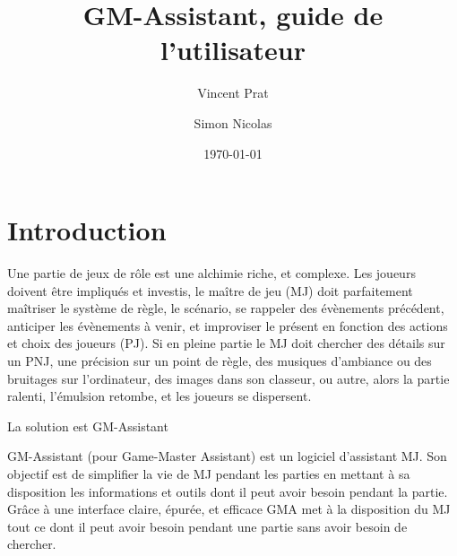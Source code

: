 \documentclass[12pt]{article}
\title{GM-Assistant, guide de l'utilisateur}
\author{
        Vincent Prat
            \and
        Simon Nicolas
}
\date{\today}
\begin{document}
\maketitle


\section{Introduction}
Une partie de jeux de rôle est une alchimie riche, et complexe. Les joueurs doivent être impliqués et investis, le maître de jeu (MJ) doit parfaitement maîtriser le système de règle, le scénario, se rappeler des évènements précédent, anticiper les évènements à venir, et improviser le présent en fonction des actions et choix des joueurs (PJ).
Si en pleine partie le MJ doit chercher des détails sur un PNJ, une précision sur un point de règle, des musiques d'ambiance ou des bruitages sur l'ordinateur, des images dans son classeur, ou autre, alors la partie ralenti, l'émulsion retombe, et les joueurs se dispersent.

La solution est GM-Assistant

GM-Assistant (pour Game-Master Assistant) est un logiciel d'assistant MJ. Son objectif est de simplifier la vie de MJ pendant les parties en mettant à sa disposition les informations et outils dont il peut avoir besoin pendant la partie.
Grâce à une interface claire, épurée, et efficace GMA met à la disposition du MJ tout ce dont il peut avoir besoin pendant une partie sans avoir besoin de chercher.
\end{document}
